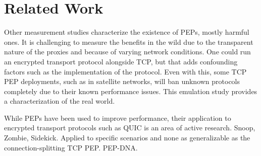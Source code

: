 \section{Related Work} \label{sec:related}

Other measurement studies characterize the existence of PEPs, mostly harmful
ones. It is challenging to measure the benefits in the wild due to the
transparent nature of the proxies and because of varying network conditions.
One could run an encrypted transport protocol alongside TCP, but that adds
confounding factors such as the implementation of the protocol. Even with this,
some TCP PEP deployments, such as in satellite networks, will ban unknown
protocols completely due to their known performance issues. This emulation
study provides a characterization of the real world.

While PEPs have been used to improve performance, their application to encrypted
transport protocols such as QUIC is an area of active research. Snoop, Zombie,
Sidekick. Applied to specific scenarios and none as generalizable as the
connection-splitting TCP PEP. PEP-DNA.
